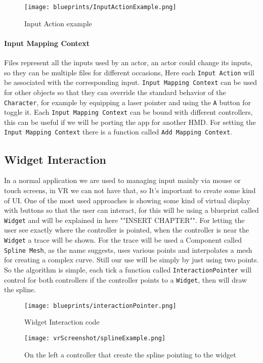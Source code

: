 \begin{figure}[h]
    \centering
    \texttt{[image: blueprints/InputActionExample.png]}
    \caption{Input Action example}
    \label{fig:InputAction}
\end{figure}

\paragraph{Input Mapping Context}
Files represent all the inputs used by an actor, an actor could change its inputs, so they can be multiple files for different occasions,
Here each \verb|Input Action| will be associated with the corresponding input.
\verb|Input Mapping Context| can be used for other objects so that they can override the standard behavior of the \verb|Character|, for example by equipping a laser pointer and using the \verb|A| button for toggle it.
Each \verb|Input Mapping Context| can be bound with different controllers, this can be useful if we will be porting the app for another \ac{HMD}.
For setting the \verb|Input Mapping Context| there is a function called \verb|Add Mapping Context|.

\subsection{Widget Interaction}
\noindent 
In a normal application we are used to managing input mainly via mouse or touch screens, in \ac{VR} we can not have that, so It's important to create some kind of \ac{UI}.
One of the most used approaches is showing some kind of virtual display with buttons so that the user can interact, for this will be using a blueprint called \verb|Widget| and will be explained in here ""INSERT CHAPTER"".
For letting the user see exactly where the controller is pointed, when the controller is near the \verb|Widget| a trace will be shown.
For the trace will be used a Component called \verb|Spline Mesh|, as the name suggests, uses various points and interpolates a mesh for creating a complex curve.
Still our use will be simply by just using two points. So the algorithm is simple, each tick a function called \verb|InteractionPointer| will control for both controllers if the controller points to a \verb|Widget|, then will draw the spline.

\begin{figure}[h]
    \centering
    \texttt{[image: blueprints/interactionPointer.png]}
    \caption{Widget Interaction code}
    \label{fig:InteractionPointer}
\end{figure}

\begin{figure}[h]
    \centering
    \texttt{[image: vrScreenshot/splineExample.png]}
    \caption{On the left a controller that create the spline pointing to the widget}
    \label{fig:splineExample}
\end{figure}